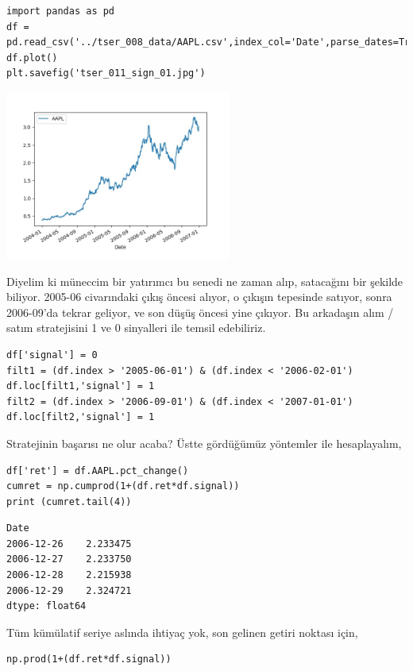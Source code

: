 \documentclass[12pt,fleqn]{article}\usepackage{../../common}
\begin{document}
\begin{verbatim}
import pandas as pd
df = pd.read_csv('../tser_008_data/AAPL.csv',index_col='Date',parse_dates=True)
df.plot()
plt.savefig('tser_011_sign_01.jpg')
\end{verbatim}

\includegraphics[width=20em]{tser_011_sign_01.jpg}

Diyelim ki müneccim bir yatırımcı bu senedi ne zaman alıp, satacağını bir
şekilde biliyor. 2005-06 civarındaki çıkış öncesi alıyor, o çıkışın tepesinde
satıyor, sonra 2006-09'da tekrar geliyor, ve son düşüş öncesi yine çıkıyor.  Bu
arkadaşın alım / satım stratejisini 1 ve 0 sinyalleri ile temsil edebiliriz.

\begin{verbatim}
df['signal'] = 0
filt1 = (df.index > '2005-06-01') & (df.index < '2006-02-01')
df.loc[filt1,'signal'] = 1
filt2 = (df.index > '2006-09-01') & (df.index < '2007-01-01')
df.loc[filt2,'signal'] = 1
\end{verbatim}

Stratejinin başarısı ne olur acaba? Üstte gördüğümüz yöntemler ile hesaplayalım,

\begin{verbatim}
df['ret'] = df.AAPL.pct_change()
cumret = np.cumprod(1+(df.ret*df.signal))
print (cumret.tail(4))
\end{verbatim}

\begin{verbatim}
Date
2006-12-26    2.233475
2006-12-27    2.233750
2006-12-28    2.215938
2006-12-29    2.324721
dtype: float64
\end{verbatim}

Tüm kümülatif seriye aslında ihtiyaç yok, son gelinen getiri noktası için,

\begin{verbatim}
np.prod(1+(df.ret*df.signal))
\end{verbatim}
\end{document}
